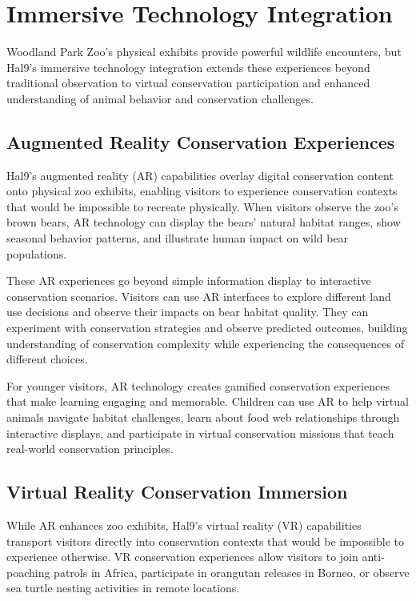 \documentclass[
  Letterpaper,
]{scrbook}
\begin{document}
\section{Immersive Technology
Integration}\label{immersive-technology-integration}

Woodland Park Zoo's physical exhibits provide powerful wildlife
encounters, but Hal9's immersive technology integration extends these
experiences beyond traditional observation to virtual conservation
participation and enhanced understanding of animal behavior and
conservation challenges.

\subsection{Augmented Reality Conservation
Experiences}\label{augmented-reality-conservation-experiences}

Hal9's augmented reality (AR) capabilities overlay digital conservation
content onto physical zoo exhibits, enabling visitors to experience
conservation contexts that would be impossible to recreate physically.
When visitors observe the zoo's brown bears, AR technology can display
the bears' natural habitat ranges, show seasonal behavior patterns, and
illustrate human impact on wild bear populations.

These AR experiences go beyond simple information display to interactive
conservation scenarios. Visitors can use AR interfaces to explore
different land use decisions and observe their impacts on bear habitat
quality. They can experiment with conservation strategies and observe
predicted outcomes, building understanding of conservation complexity
while experiencing the consequences of different choices.

For younger visitors, AR technology creates gamified conservation
experiences that make learning engaging and memorable. Children can use
AR to help virtual animals navigate habitat challenges, learn about food
web relationships through interactive displays, and participate in
virtual conservation missions that teach real-world conservation
principles.

\subsection{Virtual Reality Conservation
Immersion}\label{virtual-reality-conservation-immersion}

While AR enhances zoo exhibits, Hal9's virtual reality (VR) capabilities
transport visitors directly into conservation contexts that would be
impossible to experience otherwise. VR conservation experiences allow
visitors to join anti-poaching patrols in Africa, participate in
orangutan releases in Borneo, or observe sea turtle nesting activities
in remote locations.
\end{document}
